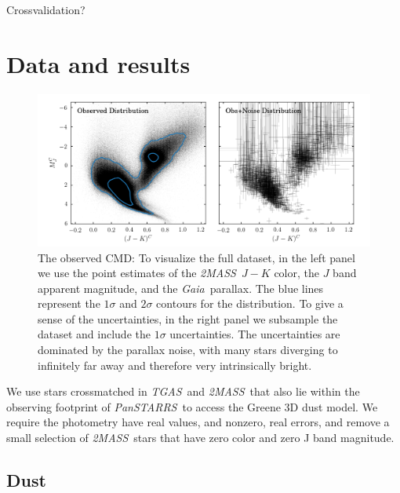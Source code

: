 \documentclass[modern]{aastex61}
\newcommand{\acronym}[1]{{\small{#1}}}
\newcommand{\project}[1]{\textsl{#1}}
\newcommand{\tgas}{\project{\acronym{TGAS}}}
\newcommand{\tmass}{\project{\acronym{2MASS}}}
\newcommand{\gaia}{\project{Gaia}}
\newcommand{\panstarrs}{\project{Pan\acronym{STARRS}}}
\newcommand{\cmd}{\acronym{CMD}}
\begin{document}
Crossvalidation?

\section{Data and results}
\begin{figure}
\centering
  \includegraphics[width=\textwidth]{data.png}
\caption{The observed \cmd: To visualize the full dataset, in the left panel we use the point estimates of the \tmass\ $J-K$ color, the $J$ band apparent magnitude, and the \gaia\ parallax. The blue lines represent the $1\sigma$ and $2\sigma$ contours for the distribution. To give a sense of the uncertainties, in the right panel we subsample the dataset and include the $1\sigma$ uncertainties. The uncertainties are dominated by the parallax noise, with many stars diverging to infinitely far away and therefore very intrinsically bright.}
\label{fig:data}
\end{figure}

We use stars crossmatched in \tgas\ and \tmass\, that also lie within the observing footprint of \panstarrs\ to access the Greene 3D dust model. We require the photometry have real values, and nonzero, real errors, and remove a small selection of \tmass\ stars that have zero color and zero J band magnitude.

\subsection{Dust}
\end{document}
